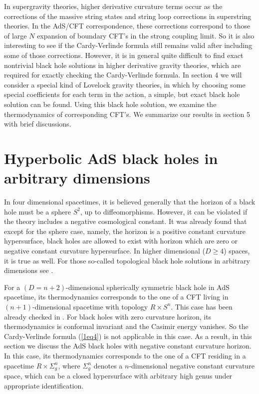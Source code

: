 \documentclass[a4paper,12pt]{article}
\newcommand{\sect}[1]{\setcounter{equation}{0}\section{#1}}
\begin{document}
 In supergravity theories, higher derivative curvature terms occur as the
 corrections of the massive string states and string loop corrections in 
superstring theories. In the AdS/CFT correspondence, these corrections
 correspond to those of large $N$ expansion of boundary CFT's in the strong 
coupling limit. So it is also interesting to see if the Cardy-Verlinde formula
 still remains valid after including some of those corrections. However, it
 is in general quite difficult to find exact nontrivial
black hole solutions in higher derivative gravity theories, which are required
for exactly checking the Cardy-Verlinde formula. In section 4 we will consider
a special kind of Lovelock gravity theories, in which by choosing some special 
coefficients for each term in the action,  a simple, but exact  black hole 
solution can be found. Using this 
black hole solution, we examine the thermodynamics of corresponding CFT's.
We summarize our results in section 5 with brief discussions.    

  



\sect{Hyperbolic AdS black holes in arbitrary dimensions }

In four dimensional spacetimes, it is believed generally that the horizon
of a black hole must be a sphere $S^2$, up to diffeomorphisms. However, it 
can be violated if the theory includes a negative cosmological constant. 
It was already found that except for the sphere case, namely, the horizon is 
a positive constant curvature hypersurface, black holes are allowed to exist 
with horizon which are zero or negative constant curvature hypersurface. In 
higher dimensional ($D\ge 4$) spaces, it is true as well.  For those so-called
topological black hole solutions in arbitrary dimensions see \cite{Birm}.


For a $(D=n+2)$-dimensional spherically symmetric black hole in AdS spacetime,
its thermodynamics corresponds to the one of a CFT living in 
$(n+1)$-dimensional
spacetime with topology $R \times S^n$. This case has been already checked
in \cite{Verl}. For black holes with zero curvature horizon, its 
thermodynamics is conformal invariant and the Casimir energy vanishes.
So the Cardy-Verlinde formula (\ref{1eq4}) is not applicable in this case.
As a result, in this section we discuss the AdS black holes with negative 
constant curvature horizon.  In this case, its thermodynamics corresponds
to the one of a CFT residing in a spacetime $R \times \Sigma_g^n$, where
$\Sigma_g^n$ denotes a $n$-dimensional negative constant curvature space, 
which can be a closed hypersurface with arbitrary high genus under 
appropriate identification. 
\end{document}
